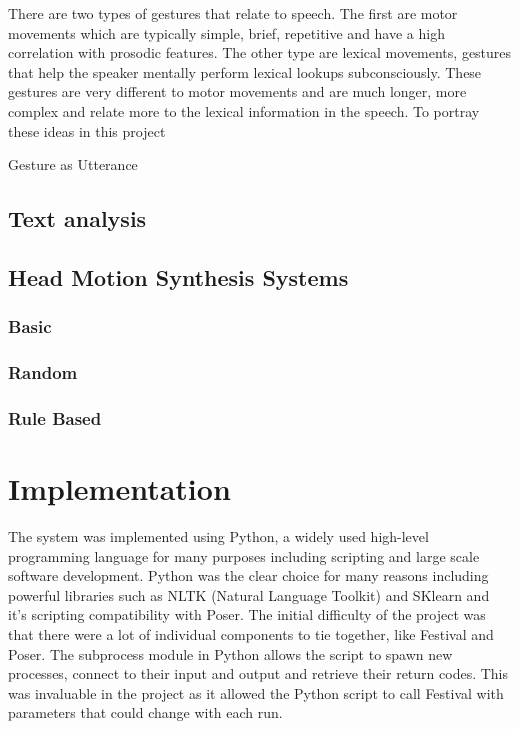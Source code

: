 \documentclass[bsc,frontabs,twoside,singlespacing,parskip]{infthesis}
\begin{document}
There are two types of gestures that relate to speech. \cite{lexical_gestures} The first are motor movements which are typically simple, brief, repetitive and have a high correlation with prosodic features. The other type are lexical movements, gestures that help the speaker mentally perform lexical lookups subconsciously. These gestures are very different to motor movements and are much longer, more complex and relate more to the lexical information in the speech. To portray these ideas in this project 

\cite{kendon} Gesture as Utterance\\

\section{Text analysis}

\section{Head Motion Synthesis Systems}

\subsection{Basic}

\subsection{Random}

\subsection{Rule Based}

\chapter{Implementation}

The system was implemented using Python, a widely used high-level programming language for many purposes including scripting and large scale software development. Python was the clear choice for many reasons including powerful libraries such as NLTK (Natural Language Toolkit) \cite{nltk} and SKlearn \cite{sklearn} and it's scripting compatibility with Poser. The initial difficulty of the project was that there were a lot of individual components to tie together, like Festival and Poser. The subprocess module in Python allows the script to spawn new processes, connect to their input and output and retrieve their return codes. This was invaluable in the project as it allowed the Python script to call Festival with parameters that could change with each run.
\end{document}
